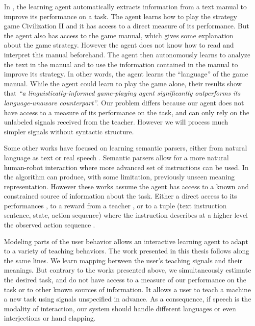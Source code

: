 In \cite{branavan2011learning}, the learning agent automatically extracts information from a text manual to improve its performance on a task. The agent learns how to play the strategy game Civilization II and it has access to a direct measure of its performance. But the agent also has access to the game manual, which gives some explanation about the game strategy. However the agent does not know how to read and interpret this manual beforehand. The agent then autonomously learns to analyze the text in the manual and to use the information contained in the manual to improve its strategy. In other words, the agent learns the ``language'' of the game manual. While the agent could learn to play the game alone, their results show that \textit{``a linguistically-informed game-playing agent significantly outperforms its language-unaware counterpart''}. Our problem differs because our agent does not have access to a measure of its performance on the task, and can only rely on the unlabeled signals received from the teacher. However we will process much simpler signals without syntactic structure.

Some other works have focused on learning semantic parsers, either from natural language as text \cite{branavan2011learning,kim2012unsupervised} or real speech \cite{doshi2008spoken}. Semantic parsers allow for a more natural human-robot interaction where more advanced set of instructions can be used. In \cite{kim2012unsupervised} the algorithm can produce, with some limitation, previously unseen meaning representation. However these works assume the agent has access to a known and constrained source of information about the task. Either a direct access to its performances \cite{branavan2011learning}, to a reward from a teacher \cite{doshi2008spoken}, or to a tuple (text instruction sentence, state, action sequence) where the instruction describes at a higher level the observed action sequence \cite{kim2012unsupervised}.

\transition

Modeling parts of the user behavior allows an interactive learning agent to adapt to a variety of teaching behaviors. The work presented in this thesis follows along the same lines. We learn mapping between the user's teaching signals and their meanings. But contrary to the works presented above, we simultaneously estimate the desired task, and do not have access to a measure of our performance on the task or to other known sources of information. It allows a user to teach a machine a new task using signals unspecified in advance. As a consequence, if speech is the modality of interaction, our system should handle different languages or even interjections or hand clapping.

